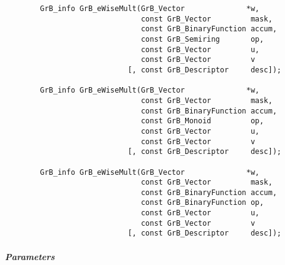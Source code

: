 \begin{verbatim}
        GrB_info GrB_eWiseMult(GrB_Vector              *w,
                               const GrB_Vector         mask,
                               const GrB_BinaryFunction accum,
                               const GrB_Semiring       op, 
                               const GrB_Vector         u,
                               const GrB_Vector         v
                            [, const GrB_Descriptor     desc]);
                            
        GrB_info GrB_eWiseMult(GrB_Vector              *w,
                               const GrB_Vector         mask,
                               const GrB_BinaryFunction accum,
                               const GrB_Monoid         op, 
                               const GrB_Vector         u,
                               const GrB_Vector         v
                            [, const GrB_Descriptor     desc]);
                            
        GrB_info GrB_eWiseMult(GrB_Vector              *w,
                               const GrB_Vector         mask,
                               const GrB_BinaryFunction accum,
                               const GrB_BinaryFunction op, 
                               const GrB_Vector         u,
                               const GrB_Vector         v
                            [, const GrB_Descriptor     desc]);
\end{verbatim}

\subparagraph{Parameters}

